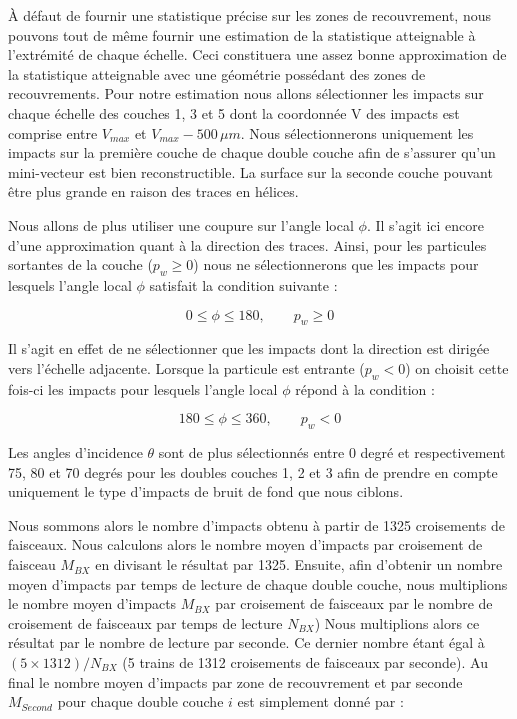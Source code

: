   \medskip
  
  \`A d\'efaut de fournir une statistique pr\'ecise sur les zones de recouvrement, nous pouvons tout de même fournir une estimation de la statistique atteignable \`a l'extr\'emité de chaque \'echelle. Ceci constituera une assez bonne approximation de la statistique atteignable avec une g\'eom\'etrie possédant des zones de recouvrements. Pour notre estimation nous allons s\'electionner les impacts sur chaque \'echelle des couches 1, 3 et 5 dont la coordonn\'ee V des impacts est comprise entre $V_{max}$ et $V_{max}-500 \, \mu m$. Nous s\'electionnerons uniquement les impacts sur la premi\`ere couche de chaque double couche afin de s'assurer qu'un mini-vecteur est bien reconstructible. La surface sur la seconde couche pouvant \^etre plus grande en raison des traces en h\'elices.
  
  \medskip
  
  Nous allons de plus utiliser une coupure sur l'angle local $\phi$. Il s'agit ici encore d'une approximation quant \`a la direction des traces. Ainsi, pour les particules sortantes de la couche ($p_w \geq 0$) nous ne s\'electionnerons que les impacts pour lesquels l'angle local $\phi$ satisfait la condition suivante :
  
  \begin{equation}
  0 \leq \phi \leq 180, \qquad p_w \geq 0
  \end{equation}
  
  Il s'agit en effet de ne sélectionner que les impacts dont la direction est dirig\'ee vers l'\'echelle adjacente. Lorsque la particule est entrante ($p_w<0$) on choisit cette fois-ci les impacts pour lesquels l'angle local $\phi$ r\'epond \`a la condition : 
  
  \begin{equation}
  180 \leq \phi \leq 360, \qquad p_w < 0
  \end{equation}
  
  Les angles d'incidence $\theta$ sont de plus s\'electionn\'es entre 0 degr\'e et respectivement 75, 80 et 70 degr\'es pour les doubles couches 1, 2 et 3 afin de prendre en compte uniquement le type d'impacts de bruit de fond que nous ciblons.
  
  \medskip
  
  Nous sommons alors le nombre d'impacts obtenu \`a partir de 1325 croisements de faisceaux. Nous calculons alors le nombre moyen d'impacts par croisement de faisceau $M_{BX}$ en divisant le r\'esultat par 1325. Ensuite, afin d'obtenir un nombre moyen d'impacts par temps de lecture de chaque double couche, nous multiplions le nombre moyen d'impacts $M_{BX}$ par croisement de faisceaux par le nombre de croisement de faisceaux par temps de lecture $N_{BX}$) Nous multiplions alors ce résultat par le nombre de lecture par seconde. Ce dernier nombre \'etant \'egal \`a $(5 \times 1312)/N_{BX}$ (5 trains de 1312 croisements de faisceaux par seconde). Au final le nombre moyen d'impacts par zone de recouvrement et par seconde $M_{Second}$ pour chaque double couche $i$ est simplement donn\'e par : 
  
